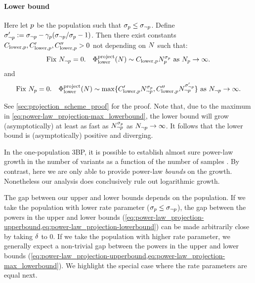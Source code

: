 \begin{myProposition}
	\paragraph{Lower bound} Here let $p$ be the population such that $\sigma_{p} \le \sigma_{\neg p}$.
	Define $\sigma_{\neg p}' := \sigma_{\neg p}-\gamma_{p}(\sigma_{\neg p}/\sigma_{p}-1)$. 
	Then there exist constants $C_{\mathrm{lower},p}, C_{\mathrm{lower},p}', C_{\mathrm{lower},p}'' > 0$
	not depending on $\vecsamplesize$ such that:
	\begin{equation}
	\label{eq:power-law_projection-lowerbound}
		\textrm{Fix } \samplesize{\notpopidx} = 0. \quad  \lowerboundproject(\vecsamplesize) \sim \constantlower{\popidx} \samplesize{\popidx}^{\rate{\popidx}}
				\textrm{ as } \samplesize{\popidx} \to \infty.
	\end{equation}
	and
	\begin{equation}
	\label{eq:power-law_projection-max_lowerbound}
		\textrm{Fix } \samplesize{\popidx} = 0. \quad  \lowerboundproject(\vecsamplesize)
			\sim \max\{ \constantlowerwithotherrate{\popidx} \samplesize{\notpopidx}^{\rate{\popidx}}, \constantlowerwithrateprime{\popidx}\samplesize{\notpopidx}^{\rate{\notpopidx}'} \}
				\textrm{ as } \samplesize{\notpopidx} \to \infty.
	\end{equation}
\end{myProposition}

See \cref{sec:projection_scheme_proof} for the proof.
Note that, due to the maximum in \cref{eq:power-law_projection-max_lowerbound}, the lower bound will grow (asymptotically) at least as fast as 
$N_{\neg p}^{\sigma_{p}}$ as $N_{\neg p} \to \infty$. It follows that the lower bound is (asymptotically) positive and diverging.

In the one-population 3BP, it is possible to establish almost sure power-law growth in the number of variants as a function of the number of samples \citep{Broderick2012, teh2009indian}. By contrast, here we are only able to provide power-law \emph{bounds} on the growth. Nonetheless our analysis does conclusively rule out logarithmic growth.

The gap between our upper and lower bounds depends on the population. If we take the population with lower rate parameter ($\sigma_{p} \le \sigma_{\neg p}$), the gap between the powers in the upper and lower bounds (\cref{eq:power-law_projection-upperbound,eq:power-law_projection-lowerbound}) can be made arbitrarily close by taking $\delta$ to 0. If we take the population with higher rate parameter, we generally expect a non-trivial gap between the powers in the upper and lower bounds (\cref{eq:power-law_projection-upperbound,eq:power-law_projection-max_lowerbound}). We highlight the special case where the rate parameters are equal next.

